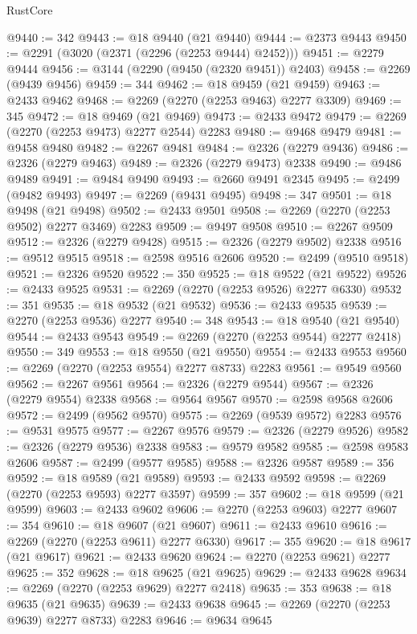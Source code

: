 \begin{lexlean}{RustCore}
\begin{coremodule}
@9440 := 342
@9443 := @18 @9440 (@21 @9440)
@9444 := @2373 @9443
@9450 := @2291 (@3020 (@2371 (@2296 (@2253 @9444) @2452)))
@9451 := @2279 @9444
@9456 := @3144 (@2290 (@9450 (@2320 @9451)) @2403)
@9458 := @2269 (@9439 @9456)
@9459 := 344
@9462 := @18 @9459 (@21 @9459)
@9463 := @2433 @9462
@9468 := @2269 (@2270 (@2253 @9463) @2277 @3309)
@9469 := 345
@9472 := @18 @9469 (@21 @9469)
@9473 := @2433 @9472
@9479 := @2269 (@2270 (@2253 @9473) @2277 @2544) @2283
@9480 := @9468 @9479
@9481 := @9458 @9480
@9482 := @2267 @9481
@9484 := @2326 (@2279 @9436)
@9486 := @2326 (@2279 @9463)
@9489 := @2326 (@2279 @9473) @2338
@9490 := @9486 @9489
@9491 := @9484 @9490
@9493 := @2660 @9491 @2345
@9495 := @2499 (@9482 @9493)
@9497 := @2269 (@9431 @9495)
@9498 := 347
@9501 := @18 @9498 (@21 @9498)
@9502 := @2433 @9501
@9508 := @2269 (@2270 (@2253 @9502) @2277 @3469) @2283
@9509 := @9497 @9508
@9510 := @2267 @9509
@9512 := @2326 (@2279 @9428)
@9515 := @2326 (@2279 @9502) @2338
@9516 := @9512 @9515
@9518 := @2598 @9516 @2606
@9520 := @2499 (@9510 @9518)
@9521 := @2326 @9520
@9522 := 350
@9525 := @18 @9522 (@21 @9522)
@9526 := @2433 @9525
@9531 := @2269 (@2270 (@2253 @9526) @2277 @6330)
@9532 := 351
@9535 := @18 @9532 (@21 @9532)
@9536 := @2433 @9535
@9539 := @2270 (@2253 @9536) @2277
@9540 := 348
@9543 := @18 @9540 (@21 @9540)
@9544 := @2433 @9543
@9549 := @2269 (@2270 (@2253 @9544) @2277 @2418)
@9550 := 349
@9553 := @18 @9550 (@21 @9550)
@9554 := @2433 @9553
@9560 := @2269 (@2270 (@2253 @9554) @2277 @8733) @2283
@9561 := @9549 @9560
@9562 := @2267 @9561
@9564 := @2326 (@2279 @9544)
@9567 := @2326 (@2279 @9554) @2338
@9568 := @9564 @9567
@9570 := @2598 @9568 @2606
@9572 := @2499 (@9562 @9570)
@9575 := @2269 (@9539 @9572) @2283
@9576 := @9531 @9575
@9577 := @2267 @9576
@9579 := @2326 (@2279 @9526)
@9582 := @2326 (@2279 @9536) @2338
@9583 := @9579 @9582
@9585 := @2598 @9583 @2606
@9587 := @2499 (@9577 @9585)
@9588 := @2326 @9587
@9589 := 356
@9592 := @18 @9589 (@21 @9589)
@9593 := @2433 @9592
@9598 := @2269 (@2270 (@2253 @9593) @2277 @3597)
@9599 := 357
@9602 := @18 @9599 (@21 @9599)
@9603 := @2433 @9602
@9606 := @2270 (@2253 @9603) @2277
@9607 := 354
@9610 := @18 @9607 (@21 @9607)
@9611 := @2433 @9610
@9616 := @2269 (@2270 (@2253 @9611) @2277 @6330)
@9617 := 355
@9620 := @18 @9617 (@21 @9617)
@9621 := @2433 @9620
@9624 := @2270 (@2253 @9621) @2277
@9625 := 352
@9628 := @18 @9625 (@21 @9625)
@9629 := @2433 @9628
@9634 := @2269 (@2270 (@2253 @9629) @2277 @2418)
@9635 := 353
@9638 := @18 @9635 (@21 @9635)
@9639 := @2433 @9638
@9645 := @2269 (@2270 (@2253 @9639) @2277 @8733) @2283
@9646 := @9634 @9645

\end{coremodule}
\end{lexlean}
